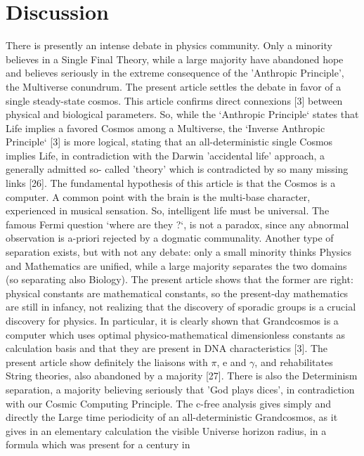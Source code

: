 \documentclass[twoside,draft]{article}
\begin{document}
{\section {Discussion}

There is presently an intense debate in physics community. Only a minority believes in a Single
Final Theory, while a large majority have abandoned hope and believes seriously in the extreme
consequence of the 'Anthropic Principle', the Multiverse conundrum. The present article settles the
debate in favor of a single steady-state cosmos.
This article confirms direct connexions [3] between physical and biological parameters. So,
while the `Anthropic Principle` states that Life implies a favored Cosmos among a Multiverse, the
`Inverse Anthropic Principle` [3] is more logical, stating that an all-deterministic single Cosmos
implies Life, in contradiction with the Darwin 'accidental life' approach, a generally admitted so-
called 'theory' which is contradicted by so many missing links [26]. The fundamental hypothesis of
this article is that the Cosmos is a computer. A common point with the brain is the multi-base
character, experienced in musical sensation. So, intelligent life must be universal. The famous Fermi
question `where are they ?`, is not a paradox, since any abnormal observation is a-priori rejected by a
dogmatic communality.
Another type of separation exists, but with not any debate: only a small minority thinks Physics
and Mathematics are unified, while a large majority separates the two domains (so separating also
Biology). The present article shows that the former are right: physical constants are mathematical
constants, so the present-day mathematics are still in infancy, not realizing that the discovery of
sporadic groups is a crucial discovery for physics. In particular, it is clearly shown that
Grandcosmos is a computer which uses optimal physico-mathematical dimensionless constants as
calculation basis and that they are present in DNA characteristics [3]. The present article show
definitely the liaisons with $\pi$, e and $\gamma$, and rehabilitates String theories, also abandoned by a
majority [27].
There is also the Determinism separation, a majority believing seriously that 'God plays dices',
in contradiction with our Cosmic Computing Principle. The c-free analysis gives simply and
directly the Large time periodicity of an all-deterministic Grandcosmos, as it gives in an elementary
calculation the visible Universe horizon radius, in a formula which was present for a century in
}
\end{document}
